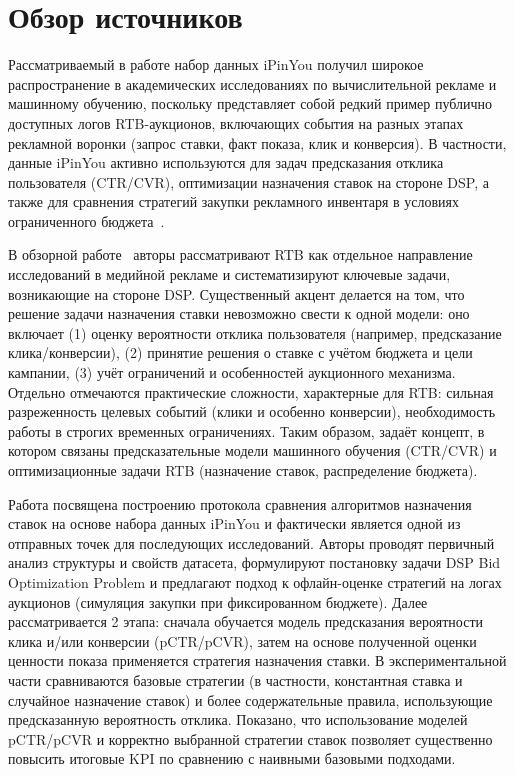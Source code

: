 \section{Обзор источников}

Рассматриваемый в работе набор данных iPinYou получил широкое распространение в академических исследованиях по вычислительной рекламе и машинному обучению, поскольку представляет собой редкий пример публично доступных логов RTB-аукционов, включающих события на разных этапах рекламной воронки (запрос ставки, факт показа, клик и конверсия). В частности, данные iPinYou активно используются для задач предсказания отклика пользователя (CTR/CVR), оптимизации назначения ставок на стороне DSP, а также для сравнения стратегий закупки рекламного инвентаря в условиях ограниченного бюджета~\cite{rtb-research, rtb-benchmarking}.

В обзорной работе~\cite{rtb-research} авторы рассматривают RTB как отдельное направление исследований в медийной рекламе и систематизируют ключевые задачи, возникающие на стороне DSP. Существенный акцент делается на том, что решение задачи назначения ставки невозможно свести к одной модели: оно включает (1) оценку вероятности отклика пользователя (например, предсказание клика/конверсии), (2) принятие решения о ставке с учётом бюджета и цели кампании, (3) учёт ограничений и особенностей аукционного механизма. Отдельно отмечаются практические сложности, характерные для RTB: сильная разреженность целевых событий (клики и особенно конверсии), необходимость работы в строгих временных ограничениях. Таким образом, \cite{rtb-research} задаёт концепт, в котором связаны предсказательные модели машинного обучения (CTR/CVR) и оптимизационные задачи RTB (назначение ставок, распределение бюджета).

Работа \cite{rtb-benchmarking} посвящена построению протокола сравнения алгоритмов назначения ставок на основе набора данных iPinYou и фактически является одной из отправных точек для последующих исследований. Авторы проводят первичный анализ структуры и свойств датасета, формулируют постановку задачи DSP Bid Optimization Problem и предлагают подход к офлайн-оценке стратегий на логах аукционов (симуляция закупки при фиксированном бюджете). Далее рассматривается 2 этапа: сначала обучается модель предсказания вероятности клика и/или конверсии (pCTR/pCVR), затем на основе полученной оценки ценности показа применяется стратегия назначения ставки. В экспериментальной части сравниваются базовые стратегии (в частности, константная ставка и случайное назначение ставок) и более содержательные правила, использующие предсказанную вероятность отклика. Показано, что использование моделей pCTR/pCVR и корректно выбранной стратегии ставок позволяет существенно повысить итоговые KPI по сравнению с наивными базовыми подходами.

